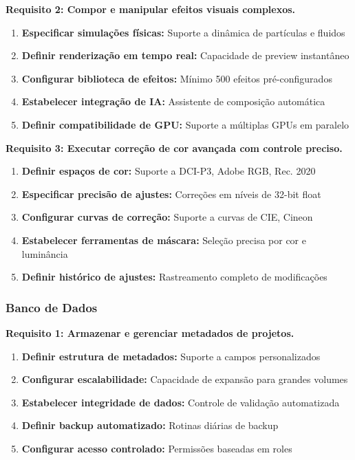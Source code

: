 \textbf{Requisito 2: Compor e manipular efeitos visuais complexos.}
\begin{enumerate}[leftmargin=*]
    \item \textbf{Especificar simulações físicas:} Suporte a dinâmica de partículas e fluidos
    \item \textbf{Definir renderização em tempo real:} Capacidade de preview instantâneo
    \item \textbf{Configurar biblioteca de efeitos:} Mínimo 500 efeitos pré-configurados
    \item \textbf{Estabelecer integração de IA:} Assistente de composição automática
    \item \textbf{Definir compatibilidade de GPU:} Suporte a múltiplas GPUs em paralelo
\end{enumerate}

\textbf{Requisito 3: Executar correção de cor avançada com controle preciso.}
\begin{enumerate}[leftmargin=*]
    \item \textbf{Definir espaços de cor:} Suporte a DCI-P3, Adobe RGB, Rec. 2020
    \item \textbf{Especificar precisão de ajustes:} Correções em níveis de 32-bit float
    \item \textbf{Configurar curvas de correção:} Suporte a curvas de CIE, Cineon
    \item \textbf{Estabelecer ferramentas de máscara:} Seleção precisa por cor e luminância
    \item \textbf{Definir histórico de ajustes:} Rastreamento completo de modificações
\end{enumerate}

\subsubsection{Banco de Dados}
\textbf{Requisito 1: Armazenar e gerenciar metadados de projetos.}
\begin{enumerate}[leftmargin=*]
    \item \textbf{Definir estrutura de metadados:} Suporte a campos personalizados
    \item \textbf{Configurar escalabilidade:} Capacidade de expansão para grandes volumes
    \item \textbf{Estabelecer integridade de dados:} Controle de validação automatizada
    \item \textbf{Definir backup automatizado:} Rotinas diárias de backup
    \item \textbf{Configurar acesso controlado:} Permissões baseadas em roles
\end{enumerate}

